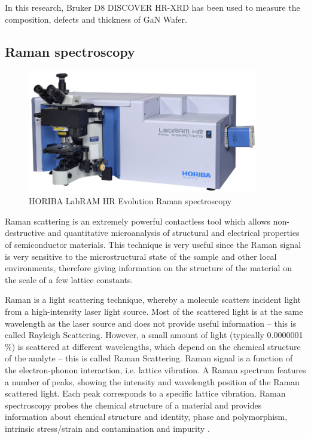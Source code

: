 In this research, Bruker D8 DISCOVER HR-XRD has been used to measure the composition, defects and thickness of GaN Wafer.

\subsection{Raman spectroscopy}

\begin{figure}[H] 
\centering    
\includegraphics[width=0.9\textwidth]{raman}
\caption[HORIBA LabRAM HR Evolution Raman spectroscopy]{HORIBA LabRAM HR Evolution Raman spectroscopy}
\label{fig:raman}
\end{figure}

Raman scattering  is an extremely powerful contactless tool which allows non-destructive and quantitative microanalysis of structural and electrical properties of semiconductor materials. This technique is very useful since the Raman signal is very sensitive to the microstructural state of the sample and other local environments, therefore giving information on the structure of the material on the scale of a few lattice  constants. 

 Raman is a light scattering technique, whereby a molecule scatters incident light from a high-intensity laser light source. Most of the scattered light is at the same wavelength as the laser source and does  not provide useful information – this is called Rayleigh Scattering. However, a small amount of light (typically 0.0000001$\%$) is scattered at different wavelengths, which depend on the chemical structure of the analyte – this is called Raman  Scattering. Raman signal is a function of the electron-phonon interaction, i.e. lattice vibration. A Raman spectrum features a number of peaks, showing the intensity and wavelength position of the Raman scattered light. Each peak corresponds to a specific lattice vibration. Raman spectroscopy  probes the chemical structure of a material and provides information about chemical structure and identity, phase and polymorphism, intrinsic stress/strain and contamination and impurity \cite{smith2019modern}.
 
